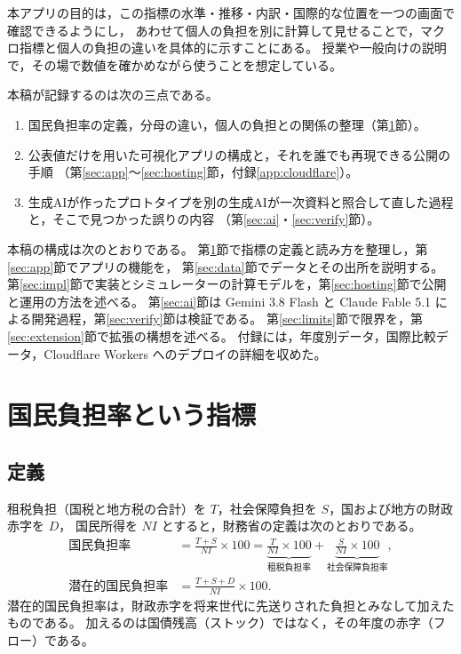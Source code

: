 \documentclass[paper=a4,fontsize=10pt]{jlreq}
\begin{document}
本アプリの目的は，この指標の水準・推移・内訳・国際的な位置を一つの画面で確認できるようにし，
あわせて個人の負担を別に計算して見せることで，マクロ指標と個人の負担の違いを具体的に示すことにある。
授業や一般向けの説明で，その場で数値を確かめながら使うことを想定している。

本稿が記録するのは次の三点である。
\begin{enumerate}
  \item 国民負担率の定義，分母の違い，個人の負担との関係の整理（第\ref{sec:indicator}節）。
  \item 公表値だけを用いた可視化アプリの構成と，それを誰でも再現できる公開の手順
    （第\ref{sec:app}〜\ref{sec:hosting}節，付録\ref{app:cloudflare}）。
  \item 生成AIが作ったプロトタイプを別の生成AIが一次資料と照合して直した過程と，そこで見つかった誤りの内容
    （第\ref{sec:ai}・\ref{sec:verify}節）。
\end{enumerate}

本稿の構成は次のとおりである。
第\ref{sec:indicator}節で指標の定義と読み方を整理し，第\ref{sec:app}節でアプリの機能を，
第\ref{sec:data}節でデータとその出所を説明する。
第\ref{sec:impl}節で実装とシミュレーターの計算モデルを，第\ref{sec:hosting}節で公開と運用の方法を述べる。
第\ref{sec:ai}節は Gemini 3.8 Flash と Claude Fable 5.1 による開発過程，第\ref{sec:verify}節は検証である。
第\ref{sec:limits}節で限界を，第\ref{sec:extension}節で拡張の構想を述べる。
付録には，年度別データ，国際比較データ，Cloudflare Workers へのデプロイの詳細を収めた。

\section{国民負担率という指標}\label{sec:indicator}

\subsection{定義}

租税負担（国税と地方税の合計）を $T$，社会保障負担を $S$，国および地方の財政赤字を $D$，
国民所得を $\mathit{NI}$ とすると，財務省の定義は次のとおりである\cite{mof2026,mofa04}。
\begin{align}
  \text{国民負担率} &= \frac{T+S}{\mathit{NI}}\times 100
    = \underbrace{\frac{T}{\mathit{NI}}\times 100}_{\text{租税負担率}}
    + \underbrace{\frac{S}{\mathit{NI}}\times 100}_{\text{社会保障負担率}}, \label{eq:burden}\\
  \text{潜在的国民負担率} &= \frac{T+S+D}{\mathit{NI}}\times 100. \label{eq:potential}
\end{align}
潜在的国民負担率は，財政赤字を将来世代に先送りされた負担とみなして加えたものである。
加えるのは国債残高（ストック）ではなく，その年度の赤字（フロー）である。
\end{document}

